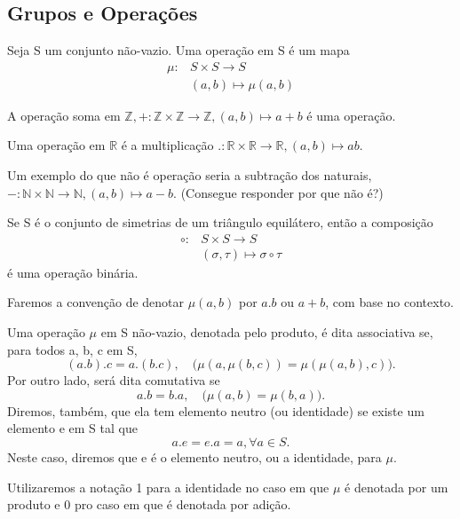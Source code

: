 \documentclass[Algebra/algebra_notes.tex]{subfiles}
\begin{document}
\subsection{Grupos e Operações}
\begin{def*}
	Seja S um conjunto não-vazio. Uma operação em S é um mapa
	\begin{align*}
		\mu: & S \times S\rightarrow S  \\
		     & (a, b)\mapsto{\mu(a, b)}
	\end{align*}
\end{def*}
\begin{example*}
	A operação soma em $\mathbb{Z}, +:\mathbb{Z}\times{\mathbb{Z}}\rightarrow \mathbb{Z}, (a, b)\mapsto a + b$ é uma operação.
\end{example*}
\begin{example*}
	Uma operação em $\mathbb{R}$ é a multiplicação $.:\mathbb{R}\times{\mathbb{R}}\rightarrow \mathbb{R}, (a, b)\mapsto ab.$
\end{example*}
\begin{example*}
	Um exemplo do que não é operação seria a subtração dos naturais, $-:\mathbb{N}\times{\mathbb{N}}\rightarrow \mathbb{N}, (a, b)\mapsto a - b.$ (Consegue responder por que não é?)
\end{example*}
\begin{example*}
	Se S é o conjunto de simetrias de um triângulo equilátero, então a composição
	\begin{align*}
		\circ: & S\times{S}\rightarrow S                \\
		       & (\sigma, \tau)\mapsto \sigma\circ \tau
	\end{align*}
	é uma operação binária.
\end{example*}
Faremos a convenção de denotar $\mu(a, b)$ por $a.b$ ou $a + b$, com base no contexto.
\begin{def*}
	Uma operação $\mu$ em S não-vazio, denotada pelo produto, é dita associativa se, para todos a, b, c em S,
	$$
		(a.b).c = a.(b.c), \quad \biggl(\mu(a, \mu(b, c)) = \mu(\mu(a, b), c)\biggr).
	$$
	Por outro lado, será dita comutativa se
	$$
		a.b = b.a, \quad \biggl(\mu(a, b) = \mu(b, a)\biggr).
	$$
	Diremos, também, que ela tem elemento neutro (ou identidade) se existe um elemento e em S tal que
	$$
		a.e = e.a = a,\forall a\in{S}.
	$$
	Neste caso, diremos que e é o elemento neutro, ou a identidade, para $\mu$.
\end{def*}
Utilizaremos a notação 1 para a identidade no caso em que $\mu$ é denotada por um produto e 0 pro caso em que é denotada por adição.
\end{document}
